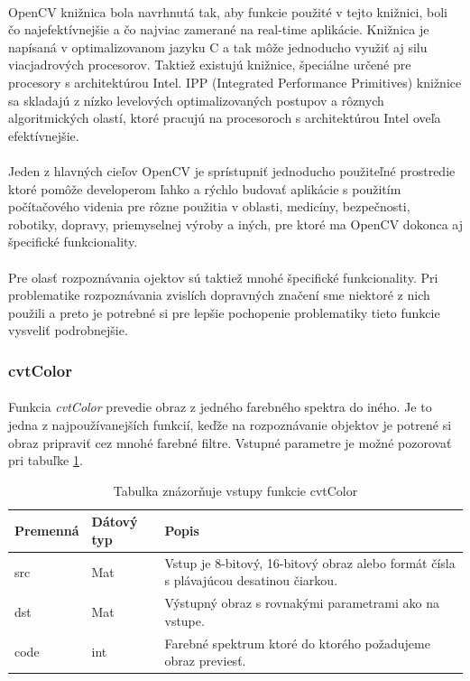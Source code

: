 \documentclass[12pt]{article}
\begin{document}
\paragraph{}
OpenCV knižnica bola navrhnutá tak, aby funkcie použité v tejto knižnici, boli čo najefektívnejšie a čo najviac zamerané na real-time aplikácie.
Knižnica je napísaná v optimalizovanom jazyku C a tak môže jednoducho využiť aj silu viacjadrových procesorov.
Taktiež existujú knižnice, špeciálne určené pre procesory s architektúrou Intel. IPP (Integrated Performance Primitives) knižnice  sa skladajú z nízko levelových 
optimalizovaných postupov a rôznych algoritmických olastí, ktoré pracujú na procesoroch s architektúrou Intel oveľa efektívnejšie.
\cite{learning_opencv}
\paragraph{}
Jeden z hlavných cieľov OpenCV je sprístupniť jednoducho použiteľné prostredie ktoré pomôže developerom ľahko a rýchlo budovať aplikácie s použitím počítačového videnia
pre rôzne použitia v oblasti, medicíny, bezpečnosti, robotiky, dopravy, priemyselnej výroby a iných, pre ktoré ma OpenCV dokonca aj špecifické funkcionality.
\cite{learning_opencv}
\paragraph{}
Pre olasť rozpoznávania ojektov sú taktiež mnohé špecifické funkcionality.
Pri problematike rozpoznávania zvislích dopravných značení sme niektoré z nich použili a preto je potrebné si pre lepšie pochopenie problematiky tieto funkcie vysveliť podrobnejšie.
\subsubsection{cvtColor}
\paragraph{}
Funkcia \emph{cvtColor} prevedie obraz z jedného farebného spektra do iného. Je to jedna z najpoužívanejších funkcií, keďže na rozpoznávanie objektov je potrené si obraz pripraviť
cez mnohé farebné filtre. Vstupné parametre je možné pozorovať pri tabuľke \ref{cvtColorPar}.
\cite{cvtColor}
\cite{OpenCVDoc}
\begin{table}
	\centering
    \begin{tabular}{ | l | l | p{5cm} |}
    \hline
    Premenná & Dátový typ & Popis \\ \hline
    src & Mat & Vstup je 8-bitový, 16-bitový obraz alebo formát čísla s plávajúcou desatinou čiarkou. \\ \hline
    dst & Mat & Výstupný obraz s rovnakými parametrami ako na vstupe. \\ \hline
    code & int & Farebné spektrum ktoré do ktorého požadujeme obraz previesť. \\
    \hline
    \end{tabular}
  	\caption{Tabulka znázorňuje vstupy funkcie cvtColor}
  	\label{cvtColorPar}
\end{table}
\end{document}
